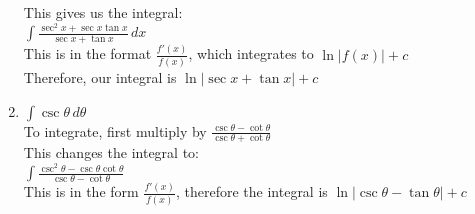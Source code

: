 \documentclass[../main.tex]{subfiles}
\begin{document}
\begin{enumerate}
    This gives us the integral:\\
    \(\int \frac{\sec^2{x}+\sec{x}\tan{x}}{\sec{x}+\tan{x}}\,dx\)\\

    This is in the format \(\frac{f'(x)}{f(x)}\), which integrates to \(\ln{|f(x)|}+c\)\\
    Therefore, our integral is \(\ln{|\sec{x}+\tan{x}|}+c\)\\

    \item 
    \(\int \csc{\theta}\,d\theta\)\\

    To integrate, first multiply by \(\frac{\csc{\theta}-\cot{\theta}}{\csc{\theta}+\cot{\theta}}\)\\
    This changes the integral to:\\
    \(\int \frac{\csc^2{\theta}-\csc{\theta}\cot{\theta}}{\csc{\theta}-\cot{\theta}}\)\\

    This is in the form \(\frac{f'(x)}{f(x)}\), therefore the integral is \(\ln{|\csc{\theta}-\tan{\theta}|}+c\)
    
    
\end{enumerate}
\end{document}
